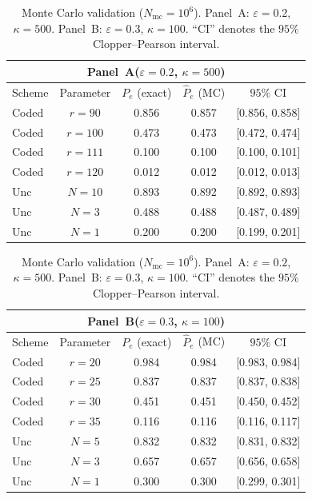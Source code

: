 \documentclass[journal]{IEEEtran}
\numberwithin{equation}{section}
\begin{document}
\begin{table}[ht]
\centering
\caption{Monte Carlo validation (\(N_{\mathrm{mc}}=10^6\)).
Panel~A: \(\varepsilon=0.2\), \(\kappa=500\). Panel~B: \(\varepsilon=0.3\), \(\kappa=100\).
``CI'' denotes the \(95\%\) Clopper--Pearson interval.}
\label{tab:mc}
\smallskip


\begin{minipage}[t]{0.48\textwidth}
\centering
\setlength{\tabcolsep}{2.5pt} %
\begin{tabular}{l|c|ccc}
\toprule
\multicolumn{5}{c}{\textbf{Panel~A}\;(\(\varepsilon=0.2\), \(\kappa=500\))} \\
\midrule
Scheme & Parameter & \(P_e\) (exact) & \(\hat P_e\) (MC) & \(95\%\) CI \\
\midrule
Coded  & \(r=90\)   & 0.856 & 0.857 & [0.856, 0.858] \\
Coded  & \(r=100\)  & 0.473 & 0.473 & [0.472, 0.474] \\
Coded  & \(r=111\)  & 0.100 & 0.100 & [0.100, 0.101] \\
Coded  & \(r=120\)  & 0.012 & 0.012 & [0.012, 0.013] \\
\midrule
Unc    & \(N=10\)   & 0.893 & 0.892 & [0.892, 0.893] \\
Unc    & \(N=3\)    & 0.488 & 0.488 & [0.487, 0.489] \\
Unc    & \(N=1\)    & 0.200 & 0.200 & [0.199, 0.201] \\
\bottomrule
\end{tabular}
\end{minipage}
\hfill
\begin{minipage}[t]{0.48\textwidth}
\centering
\setlength{\tabcolsep}{2.5pt} %
\begin{tabular}{l|c|ccc}
\toprule
\multicolumn{5}{c}{\textbf{Panel~B}\;(\(\varepsilon=0.3\), \(\kappa=100\))} \\
\midrule
Scheme & Parameter & \(P_e\) (exact) & \(\hat P_e\) (MC) & \(95\%\) CI \\
\midrule
Coded  & \(r=20\)   & 0.984 & 0.984 & [0.983, 0.984] \\
Coded  & \(r=25\)   & 0.837 & 0.837 & [0.837, 0.838] \\
Coded  & \(r=30\)   & 0.451 & 0.451 & [0.450, 0.452] \\
Coded  & \(r=35\)   & 0.116 & 0.116 & [0.116, 0.117] \\
\midrule
Unc    & \(N=5\)    & 0.832 & 0.832 & [0.831, 0.832] \\
Unc    & \(N=3\)    & 0.657 & 0.657 & [0.656, 0.658] \\
Unc    & \(N=1\)    & 0.300 & 0.300 & [0.299, 0.301] \\
\bottomrule
\end{tabular}
\end{minipage}
\end{table}
\end{document}
